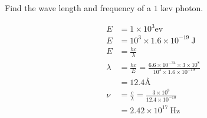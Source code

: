   \begin{exercise}
  	Find the wave length and frequency of a $1$ kev photon.
  \end{exercise}
  \begin{answer}
  	\begin{align*}
  	E&=1 \times 10^{3} \mathrm{ev}\\
  	E&=10^{3} \times 1.6 \times 10^{-19} \mathrm{~J}\\
  	E&=\frac{hc}{\lambda}\\
  	\lambda&=\frac{hc}{E}=\frac{6.6 \times 10^{-34} \times 3 \times 10^{8}}{10^{3} \times 1.6 \times 10^{-19}}\\
  	&=12.4 \text{\AA}\\
  	\nu &=\frac{c}{\lambda}=\frac{3 \times 10^{8}}{12.4 \times 10^{-10}}\\
  	&=2.42 \times 10^{17} \mathrm{~Hz}
  	\end{align*}
  	
  \end{answer}
  
